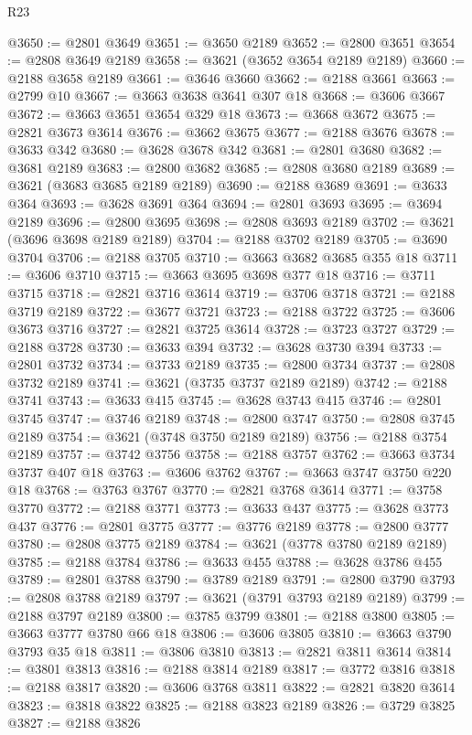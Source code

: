 \begin{lexlean}{R23}
\begin{coremodule}
{{{{{{{{{{{{{{{{{{{{{@3650 := @2801 @3649
@3651 := @3650 @2189
@3652 := @2800 @3651
@3654 := @2808 @3649 @2189
@3658 := @3621 (@3652 @3654 @2189 @2189)
@3660 := @2188 @3658 @2189
@3661 := @3646 @3660
@3662 := @2188 @3661
@3663 := @2799 @10
@3667 := @3663 @3638 @3641 @307 @18
@3668 := @3606 @3667
@3672 := @3663 @3651 @3654 @329 @18
@3673 := @3668 @3672
@3675 := @2821 @3673 @3614
@3676 := @3662 @3675
@3677 := @2188 @3676
@3678 := @3633 @342
@3680 := @3628 @3678 @342
@3681 := @2801 @3680
@3682 := @3681 @2189
@3683 := @2800 @3682
@3685 := @2808 @3680 @2189
@3689 := @3621 (@3683 @3685 @2189 @2189)
@3690 := @2188 @3689
@3691 := @3633 @364
@3693 := @3628 @3691 @364
@3694 := @2801 @3693
@3695 := @3694 @2189
@3696 := @2800 @3695
@3698 := @2808 @3693 @2189
@3702 := @3621 (@3696 @3698 @2189 @2189)
@3704 := @2188 @3702 @2189
@3705 := @3690 @3704
@3706 := @2188 @3705
@3710 := @3663 @3682 @3685 @355 @18
@3711 := @3606 @3710
@3715 := @3663 @3695 @3698 @377 @18
@3716 := @3711 @3715
@3718 := @2821 @3716 @3614
@3719 := @3706 @3718
@3721 := @2188 @3719 @2189
@3722 := @3677 @3721
@3723 := @2188 @3722
@3725 := @3606 @3673 @3716
@3727 := @2821 @3725 @3614
@3728 := @3723 @3727
@3729 := @2188 @3728
@3730 := @3633 @394
@3732 := @3628 @3730 @394
@3733 := @2801 @3732
@3734 := @3733 @2189
@3735 := @2800 @3734
@3737 := @2808 @3732 @2189
@3741 := @3621 (@3735 @3737 @2189 @2189)
@3742 := @2188 @3741
@3743 := @3633 @415
@3745 := @3628 @3743 @415
@3746 := @2801 @3745
@3747 := @3746 @2189
@3748 := @2800 @3747
@3750 := @2808 @3745 @2189
@3754 := @3621 (@3748 @3750 @2189 @2189)
@3756 := @2188 @3754 @2189
@3757 := @3742 @3756
@3758 := @2188 @3757
@3762 := @3663 @3734 @3737 @407 @18
@3763 := @3606 @3762
@3767 := @3663 @3747 @3750 @220 @18
@3768 := @3763 @3767
@3770 := @2821 @3768 @3614
@3771 := @3758 @3770
@3772 := @2188 @3771
@3773 := @3633 @437
@3775 := @3628 @3773 @437
@3776 := @2801 @3775
@3777 := @3776 @2189
@3778 := @2800 @3777
@3780 := @2808 @3775 @2189
@3784 := @3621 (@3778 @3780 @2189 @2189)
@3785 := @2188 @3784
@3786 := @3633 @455
@3788 := @3628 @3786 @455
@3789 := @2801 @3788
@3790 := @3789 @2189
@3791 := @2800 @3790
@3793 := @2808 @3788 @2189
@3797 := @3621 (@3791 @3793 @2189 @2189)
@3799 := @2188 @3797 @2189
@3800 := @3785 @3799
@3801 := @2188 @3800
@3805 := @3663 @3777 @3780 @66 @18
@3806 := @3606 @3805
@3810 := @3663 @3790 @3793 @35 @18
@3811 := @3806 @3810
@3813 := @2821 @3811 @3614
@3814 := @3801 @3813
@3816 := @2188 @3814 @2189
@3817 := @3772 @3816
@3818 := @2188 @3817
@3820 := @3606 @3768 @3811
@3822 := @2821 @3820 @3614
@3823 := @3818 @3822
@3825 := @2188 @3823 @2189
@3826 := @3729 @3825
@3827 := @2188 @3826
}}}}}}}}}}}}}}}}}}}}}
\end{coremodule}
\end{lexlean}
